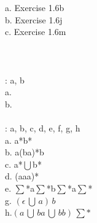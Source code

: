 \documentclass[12pt]{article}
\begin{document}
a. Exercise 1.6b \\

b. Exercise 1.6j \\

c. Exercise 1.6m \\

 \\


 \\


 \\


: a, b \\

a. \\

b. \\

 \\


: a, b, c, d, e, f, g, h \\

a. a*b* \\

b. a(ba)*b \\

c. a*$\bigcup$b* \\

d. (aaa)* \\

e. $\sum$*a$\sum$*b$\sum$*a$\sum$* \\

g. $(\epsilon \, \bigcup \, a ) \, b$ \\

h.$(a \, \bigcup \, ba \, \bigcup \, bb ) \, \sum *$ \\

 \\

 \\
\end{document}
